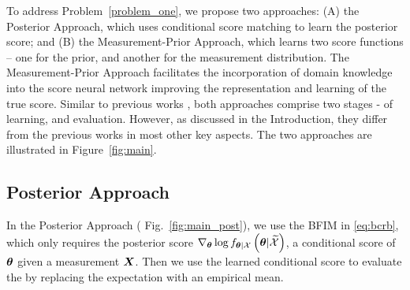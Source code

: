 To address Problem~\ref{problem_one}, we propose two approaches: 
(A) the Posterior Approach, which 
uses conditional score matching to learn the posterior score;  %
and (B) the Measurement-Prior Approach, which learns two score functions -- one for the prior, and another for the measurement distribution.
 The Measurement-Prior Approach facilitates the incorporation of domain knowledge into the score neural network {improving the representation and learning of the true score}. 
Similar to previous works \cite{habi2023learned,habi2023learning, crafts2023bayesian}, both approaches comprise two stages - of learning, and evaluation. {However, as discussed in the Introduction, they differ from the previous works in most other key aspects.}   
The two approaches %
are illustrated in Figure~\ref{fig:main}.

\subsection{Posterior Approach}\label{sec:post_learn}
In the Posterior Approach {( Fig.~\ref{fig:main_post}),} we use the BFIM in \eqref{eq:bcrb}, which only requires the posterior score $\nabla_{\bm{\theta}}\log f_{\bm{\theta}|\mathcal{X}}\left(\bm{\theta}|\widetilde{\mathcal{X}}\right)$, %
a conditional score of $\bm{\theta}$ given a measurement $\X$. Then we use the learned conditional score to evaluate the \name{} by replacing the expectation with an empirical mean. 
 
